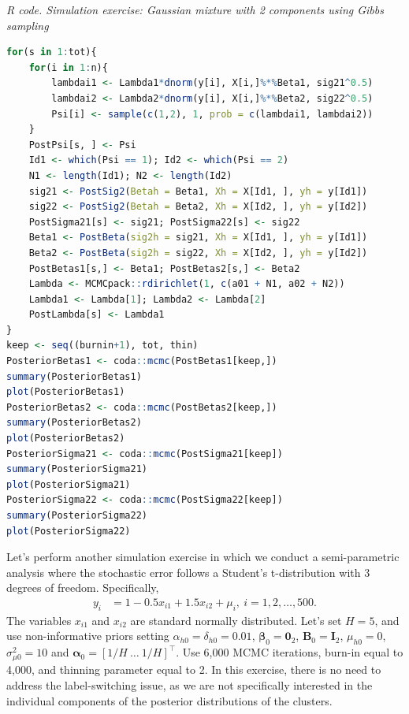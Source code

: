 \begin{tcolorbox}[enhanced,width=4.67in,center upper,
	fontupper=\large\bfseries,drop shadow southwest,sharp corners]
	\textit{R code. Simulation exercise: Gaussian mixture with 2 components using Gibbs sampling}
	\begin{VF}
		\begin{lstlisting}[language=R]
for(s in 1:tot){
	for(i in 1:n){
		lambdai1 <- Lambda1*dnorm(y[i], X[i,]%*%Beta1, sig21^0.5)
		lambdai2 <- Lambda2*dnorm(y[i], X[i,]%*%Beta2, sig22^0.5)
		Psi[i] <- sample(c(1,2), 1, prob = c(lambdai1, lambdai2))
	}
	PostPsi[s, ] <- Psi
	Id1 <- which(Psi == 1); Id2 <- which(Psi == 2)
	N1 <- length(Id1); N2 <- length(Id2)
	sig21 <- PostSig2(Betah = Beta1, Xh = X[Id1, ], yh = y[Id1])
	sig22 <- PostSig2(Betah = Beta2, Xh = X[Id2, ], yh = y[Id2])
	PostSigma21[s] <- sig21; PostSigma22[s] <- sig22
	Beta1 <- PostBeta(sig2h = sig21, Xh = X[Id1, ], yh = y[Id1])
	Beta2 <- PostBeta(sig2h = sig22, Xh = X[Id2, ], yh = y[Id2])
	PostBetas1[s,] <- Beta1; PostBetas2[s,] <- Beta2
	Lambda <- MCMCpack::rdirichlet(1, c(a01 + N1, a02 + N2))
	Lambda1 <- Lambda[1]; Lambda2 <- Lambda[2]
	PostLambda[s] <- Lambda1 
}
keep <- seq((burnin+1), tot, thin)
PosteriorBetas1 <- coda::mcmc(PostBetas1[keep,])
summary(PosteriorBetas1)
plot(PosteriorBetas1)
PosteriorBetas2 <- coda::mcmc(PostBetas2[keep,])
summary(PosteriorBetas2)
plot(PosteriorBetas2)
PosteriorSigma21 <- coda::mcmc(PostSigma21[keep])
summary(PosteriorSigma21)
plot(PosteriorSigma21)
PosteriorSigma22 <- coda::mcmc(PostSigma22[keep])
summary(PosteriorSigma22)
plot(PosteriorSigma22)
\end{lstlisting}
	\end{VF}
\end{tcolorbox}

Let's perform another simulation exercise in which we conduct a semi-parametric analysis where the stochastic error follows a Student's t-distribution with 3 degrees of freedom. Specifically,  
\begin{align*}
	y_i &= 1 - 0.5x_{i1} + 1.5x_{i2} + \mu_i, \ i=1,2,\dots,500.
\end{align*}
The variables $x_{i1}$ and $x_{i2}$ are standard normally distributed. Let's set $H=5$, and use non-informative priors setting $\alpha_{h0}=\delta_{h0}=0.01$, $\bm{\beta}_0=\bm{0}_2$, $\bm{B}_0=\bm{I}_2$, $\mu_{h0}=0$, $\sigma^2_{\mu 0}=10$ and $\bm{\alpha}_0=[1/H \ \dots \ 1/H]^{\top}$. Use 6,000 MCMC iterations, burn-in equal to 4,000, and thinning parameter equal to 2. In this exercise, there is no need to address the label-switching issue, as we are not specifically interested in the individual components of the posterior distributions of the clusters. 

